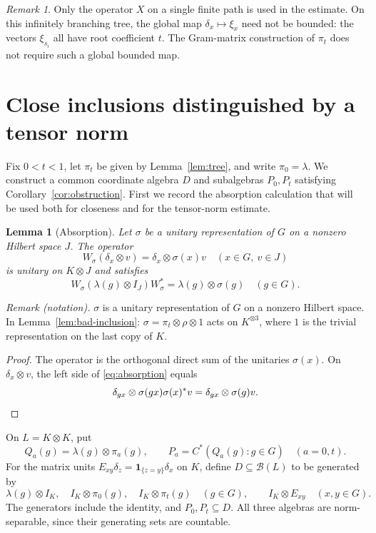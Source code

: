 \documentclass[11pt]{article}
\newtheorem{lemma}[theorem]{Lemma}
\theoremstyle{definition}
\theoremstyle{remark}
\newtheorem{remark}[theorem]{Remark}
\newcommand{\B}{\mathcal B}
\newcommand{\id}{I}
\begin{document}
\begin{remark}
Only the operator $X$ on a single finite path is used in the estimate.
On this infinitely branching tree, the global map
$\delta_x\mapsto\xi_x$ need not be bounded: the vectors
$\xi_{s_i}$ all have root coefficient $t$. The Gram-matrix construction
of $\pi_t$ does not require such a global bounded map.
\end{remark}

\section{Close inclusions distinguished by a tensor norm}\label{sec:inclusions}

Fix $0<t<1$, let $\pi_t$ be given by Lemma~\ref{lem:tree}, and write
$\pi_0=\lambda$. We construct a common coordinate algebra $D$ and
subalgebras $P_0,P_t$ satisfying Corollary~\ref{cor:obstruction}.
First we record the absorption calculation that will be used both for
closeness and for the tensor-norm estimate.

\begin{lemma}[Absorption]\label{lem:absorption}
Let $\sigma$ be a unitary representation of $G$ on a nonzero Hilbert space
$J$. The operator
\[
W_\sigma(\delta_x\otimes v)=\delta_x\otimes\sigma(x)v
\quad(x\in G,\ v\in J)
\]
is unitary on $K\otimes J$ and satisfies
\begin{equation}\label{eq:absorption}
W_\sigma(\lambda(g)\otimes\id_J)W_\sigma^*
=\lambda(g)\otimes\sigma(g)\quad(g\in G).
\end{equation}
\end{lemma}

\noindent\textit{Remark (notation).} $\sigma$ is a unitary representation of $G$ on a nonzero Hilbert space. In Lemma~\ref{lem:bad-inclusion}: $\sigma=\pi_t\otimes\rho\otimes1$ acts on $K^{\otimes3}$, where $1$ is the trivial representation on the last copy of $K$.


\begin{proof}
The operator is the orthogonal direct sum of the unitaries $\sigma(x)$.
On $\delta_x\otimes v$, the left side of \eqref{eq:absorption} equals
\[
\delta_{gx}\otimes\sigma(gx)\sigma(x)^*v
=\delta_{gx}\otimes\sigma(g)v.
\qedhere
\]
\end{proof}

On $L=K\otimes K$, put
\begin{equation}\label{eq:P}
Q_a(g)=\lambda(g)\otimes\pi_a(g),\qquad
P_a=C^*(Q_a(g):g\in G)\quad(a=0,t).
\end{equation}
For the matrix units $E_{xy}\delta_z=\mathbf1_{\{z=y\}}\delta_x$ on $K$,
define $D\subseteq\B(L)$ to be generated by
\begin{equation}\label{eq:D}
\lambda(g)\otimes\id_K,\quad \id_K\otimes\pi_0(g),\quad
\id_K\otimes\pi_t(g)\quad(g\in G),
\qquad \id_K\otimes E_{xy}\quad(x,y\in G).
\end{equation}
The generators include the identity, and $P_0,P_t\subseteq D$.
All three algebras are norm-separable, since their generating sets are
countable.
\end{document}
